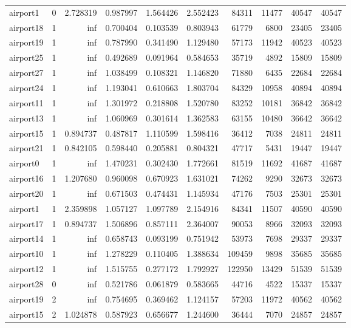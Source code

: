 \begin{longtable}{|l|r|r|r|r|r|r|r|r|r|}
airport1 & 0 & 2.728319 & 0.987997 & 1.564426 & 2.552423 & 84311 & 11477 & 40547 & 40547 \\
airport18 & 1 & inf & 0.700404 & 0.103539 & 0.803943 & 61779 & 6800 & 23405 & 23405 \\
airport19 & 1 & inf & 0.787990 & 0.341490 & 1.129480 & 57173 & 11942 & 40523 & 40523 \\
airport25 & 1 & inf & 0.492689 & 0.091964 & 0.584653 & 35719 & 4892 & 15809 & 15809 \\
airport27 & 1 & inf & 1.038499 & 0.108321 & 1.146820 & 71880 & 6435 & 22684 & 22684 \\
airport24 & 1 & inf & 1.193041 & 0.610663 & 1.803704 & 84329 & 10958 & 40894 & 40894 \\
airport11 & 1 & inf & 1.301972 & 0.218808 & 1.520780 & 83252 & 10181 & 36842 & 36842 \\
airport13 & 1 & inf & 1.060969 & 0.301614 & 1.362583 & 63155 & 10480 & 36642 & 36642 \\
airport15 & 1 & 0.894737 & 0.487817 & 1.110599 & 1.598416 & 36412 & 7038 & 24811 & 24811 \\
airport21 & 1 & 0.842105 & 0.598440 & 0.205881 & 0.804321 & 47717 & 5431 & 19447 & 19447 \\
airport0 & 1 & inf & 1.470231 & 0.302430 & 1.772661 & 81519 & 11692 & 41687 & 41687 \\
airport16 & 1 & 1.207680 & 0.960098 & 0.670923 & 1.631021 & 74262 & 9290 & 32673 & 32673 \\
airport20 & 1 & inf & 0.671503 & 0.474431 & 1.145934 & 47176 & 7503 & 25301 & 25301 \\
airport1 & 1 & 2.359898 & 1.057127 & 1.097789 & 2.154916 & 84341 & 11507 & 40590 & 40590 \\
airport17 & 1 & 0.894737 & 1.506896 & 0.857111 & 2.364007 & 90053 & 8966 & 32093 & 32093 \\
airport14 & 1 & inf & 0.658743 & 0.093199 & 0.751942 & 53973 & 7698 & 29337 & 29337 \\
airport10 & 1 & inf & 1.278229 & 0.110405 & 1.388634 & 109459 & 9898 & 35685 & 35685 \\
airport12 & 1 & inf & 1.515755 & 0.277172 & 1.792927 & 122950 & 13429 & 51539 & 51539 \\
airport28 & 0 & inf & 0.521786 & 0.061879 & 0.583665 & 44716 & 4522 & 15337 & 15337 \\
airport19 & 2 & inf & 0.754695 & 0.369462 & 1.124157 & 57203 & 11972 & 40562 & 40562 \\
airport15 & 2 & 1.024878 & 0.587923 & 0.656677 & 1.244600 & 36444 & 7070 & 24857 & 24857 \\

\end{longtable}
